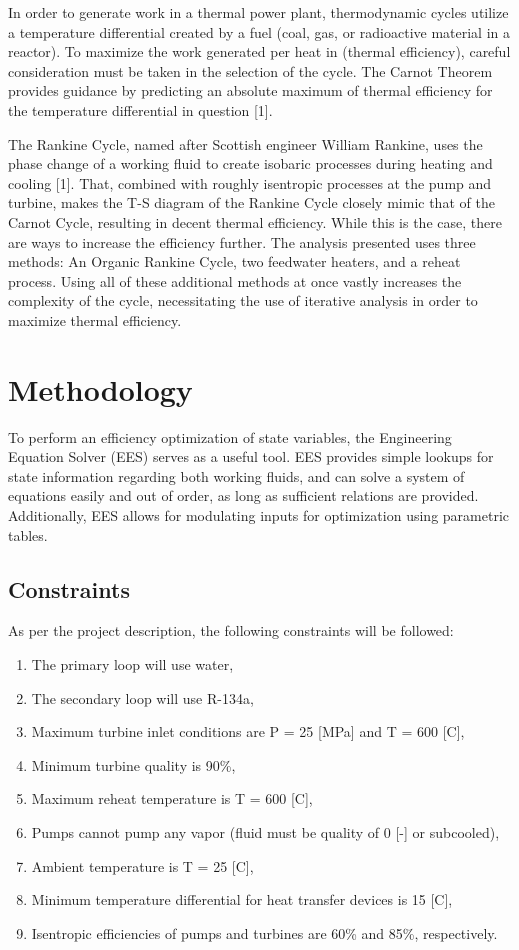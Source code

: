 \documentclass[10pt,cleanfoot]{asme2ej}
\begin{document}
In order to generate work in a thermal power plant, thermodynamic cycles utilize a temperature differential created by a fuel (coal, gas, or radioactive material in a reactor). To maximize the work generated per heat in (thermal efficiency), careful consideration must be taken in the selection of the cycle. The Carnot Theorem provides guidance by predicting an absolute maximum of thermal efficiency for the temperature differential in question [1].

The Rankine Cycle, named after Scottish engineer William Rankine, uses the phase change of a working fluid to create isobaric processes during heating and cooling [1]. That, combined with roughly isentropic processes at the pump and turbine, makes the T-S diagram of the Rankine Cycle closely mimic that of the Carnot Cycle, resulting in decent thermal efficiency. While this is the case, there are ways to increase the efficiency further. The analysis presented uses three methods: An Organic Rankine Cycle, two feedwater heaters, and a reheat process. Using all of these additional methods at once vastly increases the complexity of the cycle, necessitating the use of iterative analysis in order to maximize thermal efficiency.

\section{Methodology}

To perform an efficiency optimization of state variables, the Engineering Equation Solver (EES) serves as a useful tool. EES provides simple lookups for state information regarding both working fluids, and can solve a system of equations easily and out of order, as long as sufficient relations are provided. Additionally, EES allows for modulating inputs for optimization using parametric tables.

\subsection{Constraints}

As per the project description, the following constraints will be followed:

\begin{enumerate}
\item
The primary loop will use water,
\item
The secondary loop will use R-134a,
\item
Maximum turbine inlet conditions are P = 25 [MPa] and T = 600 [C],
\item
Minimum turbine quality is 90\%,
\item
Maximum reheat temperature is T = 600 [C],
\item
Pumps cannot pump any vapor (fluid must be quality of 0 [-] or subcooled),
\item
Ambient temperature is T = 25 [C],
\item
Minimum temperature differential for heat transfer devices is 15 [C],
\item
Isentropic efficiencies of pumps and turbines are 60\% and 85\%, respectively.
\end{enumerate}
\end{document}
